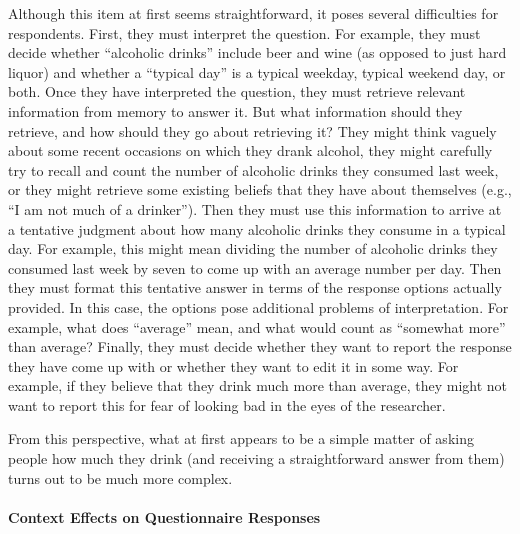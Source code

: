 \documentclass[
]{krantz}
\begin{document}
Although this item at first seems straightforward, it poses several difficulties for respondents. First, they must interpret the question. For example, they must decide whether ``alcoholic drinks'' include beer and wine (as opposed to just hard liquor) and whether a ``typical day'' is a typical weekday, typical weekend day, or both. Once they have interpreted the question, they must retrieve relevant information from memory to answer it. But what information should they retrieve, and how should they go about retrieving it? They might think vaguely about some recent occasions on which they drank alcohol, they might carefully try to recall and count the number of alcoholic drinks they consumed last week, or they might retrieve some existing beliefs that they have about themselves (e.g., ``I am not much of a drinker''). Then they must use this information to arrive at a tentative judgment about how many alcoholic drinks they consume in a typical day. For example, this might mean dividing the number of alcoholic drinks they consumed last week by seven to come up with an average number per day. Then they must format this tentative answer in terms of the response options actually provided. In this case, the options pose additional problems of interpretation. For example, what does ``average'' mean, and what would count as ``somewhat more'' than average? Finally, they must decide whether they want to report the response they have come up with or whether they want to edit it in some way. For example, if they believe that they drink much more than average, they might not want to report this for fear of looking bad in the eyes of the researcher.

From this perspective, what at first appears to be a simple matter of asking people how much they drink (and receiving a straightforward answer from them) turns out to be much more complex.

\paragraph*{Context Effects on Questionnaire Responses}\label{context-effects-on-questionnaire-responses}
\end{document}
